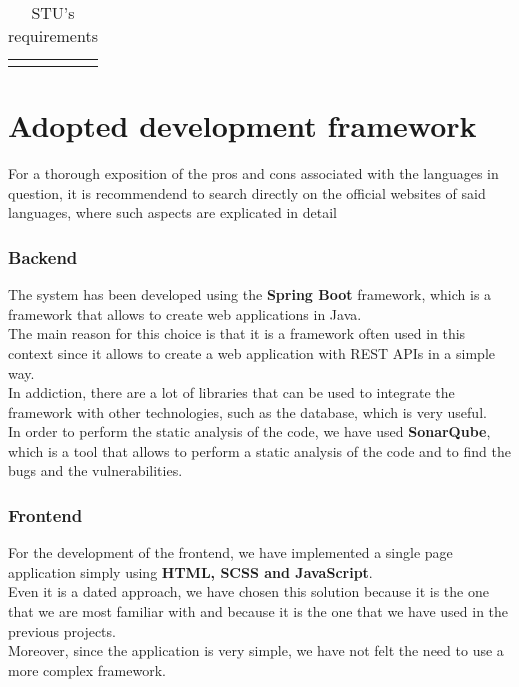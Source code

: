 \begin{longtable}[H]{l p{8cm} l p{2cm}}
                 &                                                                                                                                                                                                                       &                      &                                                                                         \\
    \hline
    \caption{STU's requirements}
\end{longtable}

\section{Adopted development framework}

For a thorough exposition of the pros and cons associated with the languages in question, it is recommendend to search directly on the official websites of said languages, where such aspects are explicated in detail

\subsubsection{Backend}
The system has been developed using the \textbf{Spring Boot} framework, which is a framework that allows to create web applications in Java.\\
The main reason for this choice is that it is a framework often used in this context since it allows to create a web application with REST APIs in a simple way.\\In addiction, there are a lot of libraries that can be used to integrate the framework with other technologies, such as the database, which is very useful.\\

In order to perform the static analysis of the code, we have used \textbf{SonarQube}, which is a tool that allows to perform a static analysis of the code and to find the bugs and the vulnerabilities.

\subsubsection{Frontend}
For the development of the frontend, we have implemented a single page application simply using \textbf{HTML, SCSS and JavaScript}.\\Even it is a dated approach, we have chosen this solution because it is the one that we are most familiar with and because it is the one that we have used in the previous projects.\\Moreover, since the application is very simple, we have not felt the need to use a more complex framework.

